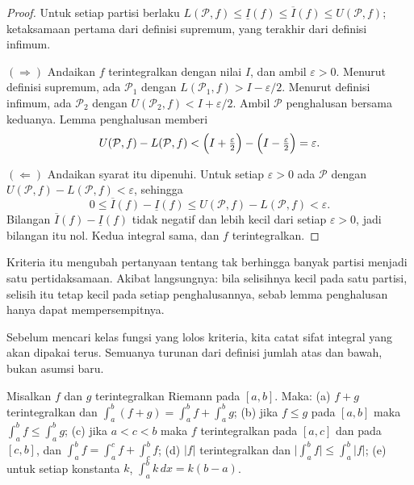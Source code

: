 \begin{proof}
Untuk setiap partisi berlaku
$L(\mathcal{P},f)\le\underline{I}(f)\le\overline{I}(f)\le U(\mathcal{P},f)$; ketaksamaan
pertama dari definisi supremum, yang terakhir dari definisi infimum.

$(\Rightarrow)$ Andaikan $f$ terintegralkan dengan nilai $I$, dan ambil
$\varepsilon>0$. Menurut definisi supremum, ada $\mathcal{P}_1$ dengan
$L(\mathcal{P}_1,f)>I-\varepsilon/2$. Menurut definisi infimum, ada $\mathcal{P}_2$
dengan $U(\mathcal{P}_2,f)<I+\varepsilon/2$. Ambil $\mathcal{P}$ penghalusan bersama
keduanya. Lemma penghalusan memberi
\[
U(\mathcal{P},f)-L(\mathcal{P},f)
<\Bigl(I+\tfrac{\varepsilon}{2}\Bigr)-\Bigl(I-\tfrac{\varepsilon}{2}\Bigr)
=\varepsilon .
\]

$(\Leftarrow)$ Andaikan syarat itu dipenuhi. Untuk setiap $\varepsilon>0$ ada
$\mathcal{P}$ dengan $U(\mathcal{P},f)-L(\mathcal{P},f)<\varepsilon$, sehingga
\[
0\le\overline{I}(f)-\underline{I}(f)\le U(\mathcal{P},f)-L(\mathcal{P},f)<\varepsilon .
\]
Bilangan $\overline{I}(f)-\underline{I}(f)$ tidak negatif dan lebih kecil dari setiap
$\varepsilon>0$, jadi bilangan itu nol. Kedua integral sama, dan $f$ terintegralkan.
\end{proof}

Kriteria itu mengubah pertanyaan tentang tak berhingga banyak partisi menjadi satu
pertidaksamaan. Akibat langsungnya: bila selisihnya kecil pada satu partisi, selisih
itu tetap kecil pada setiap penghalusannya, sebab lemma penghalusan hanya dapat
mempersempitnya.

Sebelum mencari kelas fungsi yang lolos kriteria, kita catat sifat integral yang akan
dipakai terus. Semuanya turunan dari definisi jumlah atas dan bawah, bukan asumsi
baru.

\begin{proposisi}
Misalkan $f$ dan $g$ terintegralkan Riemann pada $[a,b]$. Maka:
(a) $f+g$ terintegralkan dan $\int_a^b(f+g)=\int_a^b f+\int_a^b g$;
(b) jika $f\le g$ pada $[a,b]$ maka $\int_a^b f\le\int_a^b g$;
(c) jika $a<c<b$ maka $f$ terintegralkan pada $[a,c]$ dan pada $[c,b]$, dan
$\int_a^b f=\int_a^c f+\int_c^b f$;
(d) $|f|$ terintegralkan dan $\bigl|\int_a^b f\bigr|\le\int_a^b|f|$;
(e) untuk setiap konstanta $k$, $\int_a^b k\,dx=k(b-a)$.
\end{proposisi}

